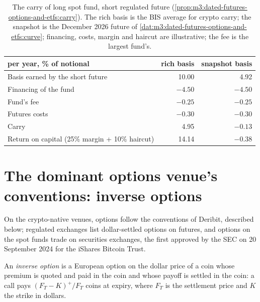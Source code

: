 \begin{table}[ht]
\centering
\small
\begin{tabular}{@{}lrr@{}}
\toprule
per year, \% of notional & rich basis & snapshot basis \\
\midrule
Basis earned by the short future & 10.00 & 4.92 \\
Financing of the fund & $-4.50$ & $-4.50$ \\
Fund's fee & $-0.25$ & $-0.25$ \\
Futures costs & $-0.30$ & $-0.30$ \\
\midrule
Carry & 4.95 & $-0.13$ \\
Return on capital (25\% margin + 10\% haircut) & 14.14 & $-0.38$ \\
\bottomrule
\end{tabular}
\caption{The carry of long spot fund, short regulated future (\cref{prop:m3:dated-futures-options-and-etfs:carry}). The
rich basis is the BIS average for crypto carry; the snapshot is the December 2026 future of
\cref{dat:m3:dated-futures-options-and-etfs:curve}; financing, costs, margin and haircut are illustrative; the fee is the
largest fund's.}\label{tab:m3:dated-futures-options-and-etfs:carry}
\end{table}

\section{The dominant options venue's conventions: inverse options}

On the crypto-native venues, options follow the conventions of Deribit, described below; regulated exchanges list
dollar-settled options on futures, and options on the spot funds trade on securities exchanges, the first approved by the SEC
on 20 September 2024 for the iShares Bitcoin Trust.

\begin{definition}\label{def:m3:dated-futures-options-and-etfs:inverse}
An \emph{inverse option} is a European option on the dollar price of a coin whose premium is
quoted and paid in the coin and whose payoff is settled in the coin: a call pays $(F_T - K)^+/F_T$ coins at expiry, where
$F_T$ is the settlement price and $K$ the strike in dollars.
\end{definition}

